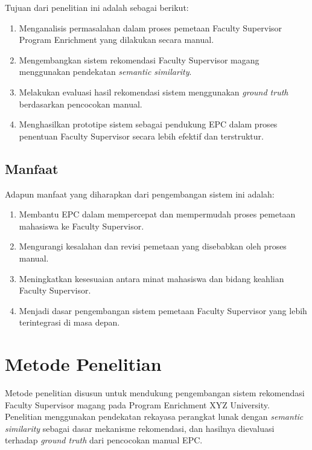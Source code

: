 Tujuan dari penelitian ini adalah sebagai berikut:

\begin{enumerate}
\def\labelenumi{\arabic{enumi}.}
\item
  Menganalisis permasalahan dalam proses pemetaan Faculty Supervisor Program Enrichment yang dilakukan secara manual.
\item
  Mengembangkan sistem rekomendasi Faculty Supervisor magang menggunakan pendekatan \textit{semantic similarity}.
\item
  Melakukan evaluasi hasil rekomendasi sistem menggunakan \textit{ground truth} berdasarkan pencocokan manual.
\item
  Menghasilkan prototipe sistem sebagai pendukung EPC dalam proses penentuan Faculty Supervisor secara lebih efektif dan terstruktur.
\end{enumerate}

\subsection{Manfaat}\label{manfaat}

Adapun manfaat yang diharapkan dari pengembangan sistem ini adalah:

\begin{enumerate}
\def\labelenumi{\arabic{enumi}.}
\item
  Membantu EPC dalam mempercepat dan mempermudah proses pemetaan mahasiswa ke Faculty Supervisor.
\item
  Mengurangi kesalahan dan revisi pemetaan yang disebabkan oleh proses manual.
\item
  Meningkatkan kesesuaian antara minat mahasiswa dan bidang keahlian Faculty Supervisor.
\item
  Menjadi dasar pengembangan sistem pemetaan Faculty Supervisor yang lebih terintegrasi di masa depan.
\end{enumerate}

\section{Metode Penelitian}\label{metode-penelitian}

Metode penelitian disusun untuk mendukung pengembangan sistem rekomendasi Faculty Supervisor magang pada Program Enrichment XYZ University. Penelitian menggunakan pendekatan rekayasa perangkat lunak dengan \textit{semantic similarity} sebagai dasar mekanisme rekomendasi, dan hasilnya dievaluasi terhadap \textit{ground truth} dari pencocokan manual EPC.

